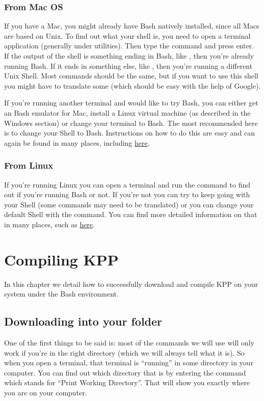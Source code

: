 \documentclass[letterpaper,10pt,openany,oneside]{sphinxmanual}
\begin{document}
\subsection{From Mac OS}
\label{bash:from-mac-os}
If you have a Mac, you might already have Bash natively installed, since all
Macs are based on Unix. To find out what your shell is, you need to open a
terminal application (generally under utilities). Then type the command  and press enter. If the output of the shell is something ending in
Bash, like , then you're already running Bash. If it ends in
something else, like , then you're running a different Unix Shell.
Most commands should be the same, but if you want to use this shell you might
have to translate some (which should be easy with the help of Google).

If you're running another terminal and would like to try Bash, you can either
get an Bash emulator for Mac, install a Linux virtual machine (as described in
the Windows section) or change your terminal to Bash. The most recommended here
is to change your Shell to Bash. Instructions on how to do this are easy and
can again be found in many places, including \href{http://osxdaily.com/2012/03/21/change-shell-mac-os-x/}{here}.


\subsection{From Linux}
\label{bash:from-linux}
If you're running Linux you can open a terminal and run the command  to find out if you're running Bash or not. If you're not you can try to
keep going with your Shell (some commands may need to be translated) or you can
change your default Shell with the  command. You can find more detailed
information on that in many places, such as \href{http://stackoverflow.com/questions/13046192/changing-default-shell-in-linux}{here}.


\chapter{Compiling KPP}
\label{compiling::doc}\label{compiling:compiling-kpp}
In this chapter we detail how to successfully download and compile KPP
on your system under the Bash environment.


\section{Downloading into your folder}
\label{compiling:downloading-into-your-folder}
One of the first things to be said is: most of the commands we will use will
only work if you're in the right directory (which we will always tell what it
is). So when you open a terminal, that terminal is ``running'' in some directory
in your computer.  You can find out which directory that is by entering the
command  which stands for ``Print Working Directory''. That will show you
exactly where you are on your computer.
\end{document}
